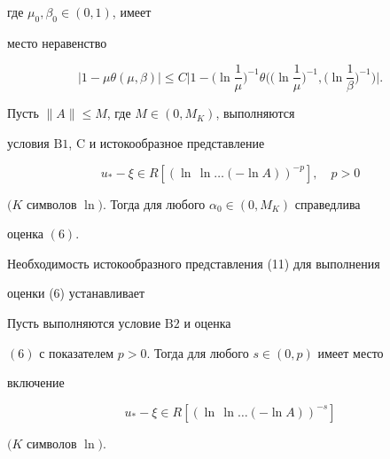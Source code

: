 где $\mu_0,\beta_0\in(0,1)$, имеет 


место неравенство 


$$ 


|1-\mu\theta(\mu,\beta)|\le C\bigg|1-\bigg(\ln\frac{1}{\mu} 


\bigg)^{-1}\theta\bigg(\bigg(\ln\frac{1}{\mu}\bigg)^{-1}, 


\bigg(\ln\frac{1}{\beta}\bigg)^{-1}\bigg)\bigg|. 


$$ 


 


\begin{thm} 


Пусть $\|A\|\le M$, где $M\in(0,M_K)$, выполняются 


условия $\mathrm B1$, $\mathrm C$ и истокообразное представление 


\begin{equation} 


u_*-\xi\in R[(\ln\,\ln\dotsc(-\ln A))^{-p}],\quad p>0 


\end{equation} 


$(K$ символов $\ln)$. Тогда для любого $\alpha_0\in(0,M_K)$ справедлива 


оценка $(6)$. 


\end{thm} 


 


Необходимость истокообразного представления (11) для выполнения 


оценки (6) устанавливает 


 


\begin{thm} 


Пусть выполняются условие $\mathrm B2$ и оценка 


$(6)$ с показателем $p>0$. Тогда для любого $s\in(0,p)$ имеет место 


включение 


\begin{equation} 


u_*-\xi\in R[(\ln\,\ln\dotsc(-\ln A))^{-s}] 


\end{equation} 


$(K$ символов $\ln)$. 


\end{thm} 


